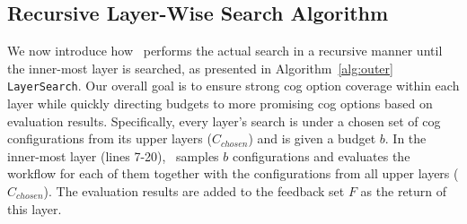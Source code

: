 


\subsection{Recursive Layer-Wise Search Algorithm}
We now introduce how \search\ performs the actual search in a recursive manner until the inner-most layer is searched, as presented in Algorithm~\ref{alg:outer} \texttt{LayerSearch}. 
Our overall goal is to ensure strong cog option coverage within each layer while quickly directing budgets to more promising cog options based on evaluation results.
Specifically, every layer's search is under a chosen set of cog configurations from its upper layers ($C_{chosen}$) and is given a budget $b$. 
In the inner-most layer (lines 7-20), \search\ samples $b$ configurations and evaluates the workflow for each of them together with the configurations from all upper layers ($C_{chosen}$). The evaluation results are added to the feedback set $F$ as the return of this layer.

